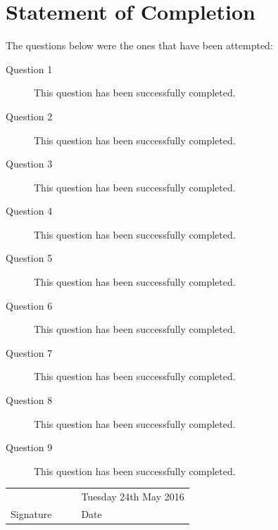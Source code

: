 \documentclass[12pt,a4paper,onesided]{report}
\begin{document}
\chapter*{Statement of Completion}
The questions below were the ones that have been attempted:
	\begin{description}
		\item[Question 1]This question has been successfully completed.
		\item[Question 2]This question has been successfully completed.
		\item[Question 3]This question has been successfully completed.
		\item[Question 4]This question has been successfully completed.
		\item[Question 5]This question has been successfully completed.
		\item[Question 6]This question has been successfully completed.
		\item[Question 7]This question has been successfully completed.
		\item[Question 8]This question has been successfully completed.
		\item[Question 9]This question has been successfully completed.
	\end{description}

\vspace{5em}
\begin{table}[h]
	\centering
\begin{tabular}{lp{20ex}p{20ex}lp{20ex}}
	 & & & \multicolumn{2}{l}{Tuesday 24th May 2016} \\\cline{1-2} \cline{4-5}
	 Signature & & & Date &\\
\end{tabular}
\end{table}
\end{document}
